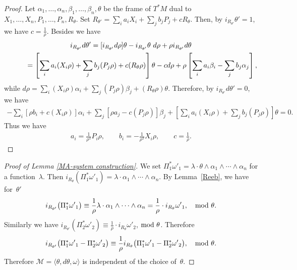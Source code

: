 \documentclass[pdftex]{sigma}
\begin{document}
\begin{proof}
Let
$\alpha_1, \dots, \alpha_n, \beta_1, \dots, \beta_n, \theta$ be
the frame of $T^*M$ dual to
$X_1, \dots, X_n, P_1, \dots, P_n, R_\theta$.
Set $R_{\theta'} = \sum_i a_iX_i + \sum_j b_jP_j + cR_{\theta}$.
Then, by $i_{R_{\theta'}} \theta' = 1$, we have $c = \frac{1}{\rho}$.
Besides we have
\begin{gather*}
i_{R_{\theta'}} d\theta'  =  [i_{R_{\theta'}} d\rho]\theta -
i_{R_{\theta'}} \theta\ d\rho
+ \rho i_{R_{\theta'}} d\theta
\\
\hphantom{i_{R_{\theta'}} d\theta'}{}
 =
\left[\sum_i a_i(X_i\rho) + \sum_j b_j(P_j\rho) + c(R_\theta\rho)\right]\theta
- c d\rho + \rho\left[\sum_i a_i\beta_i - \sum_j b_j\alpha_j\right],
\end{gather*}
while $d\rho = \sum_i (X_i\rho)\alpha_i + \sum_j (P_j\rho)\beta_j
+ (R_\theta \rho)\theta$.
Therefore, by $i_{R_{\theta'}} d\theta' = 0$, we have
\begin{gather*}
- \sum_i [\rho b_i + c(X_i\rho)]\alpha_i +
\sum_j [\rho a_j - c(P_j\rho)]\beta_j
+ \left[\sum_i a_i(X_i\rho) + \sum_j b_j(P_j\rho)\right]\theta = 0.
\end{gather*}
Thus we have
\begin{gather*}
a_i = \frac{1}{\rho^2} P_i\rho, \qquad
b_i = - \frac{1}{\rho^2} X_i\rho, \qquad
c = \frac{1}{\rho}.\tag*{\qed}
\end{gather*}
\renewcommand{\qed}{}
\end{proof}

\begin{proof}[Proof of Lemma \ref{MA-system construction}]
We set $\Pi_1^*{\omega'}_1 =
\lambda\cdot \theta\wedge\alpha_1\wedge\cdots\wedge\alpha_n$
for a function~$\lambda$.
Then
$i_{R_{\theta}} (\Pi_1^*{\omega'}_1)
= \lambda\cdot \alpha_1\wedge\cdots\wedge\alpha_n$.
By Lemma~\ref{Reeb}, we have for~$\theta'$
\begin{gather*}
i_{R_{\theta'}} \big(\Pi_1^*{\omega'}_1\big)
\equiv \frac{1}{\rho}\lambda\cdot \alpha_1\wedge\cdots\wedge\alpha_n
= \frac{1}{\rho}\cdot i_{R_{\theta}} {\omega'}_1,\quad \rm{mod}\ \theta.
\end{gather*}
Similarly we have
$i_{R_{\theta'}} (\Pi_2^*{\omega'}_2)
\equiv \frac{1}{\rho}\cdot i_{R_{\theta}} {\omega'}_2$, $\rm{mod}\ \theta$.
Therefore
\begin{gather*}
i_{R_{\theta'}} \big(\Pi_1^*{\omega'}_1 - \Pi_2^*{\omega'}_2\big) \equiv
\frac{1}{\rho} i_{R_{\theta}} \big(\Pi_1^*{\omega'}_1 - \Pi_2^*{\omega'}_2\big),\quad
\rm{mod}\ \theta.
\end{gather*}
Therefore $\mathcal{M} = \langle \theta, d\theta, \omega\rangle$
is independent of the choice of~$\theta$.
\end{proof}
\end{document}
